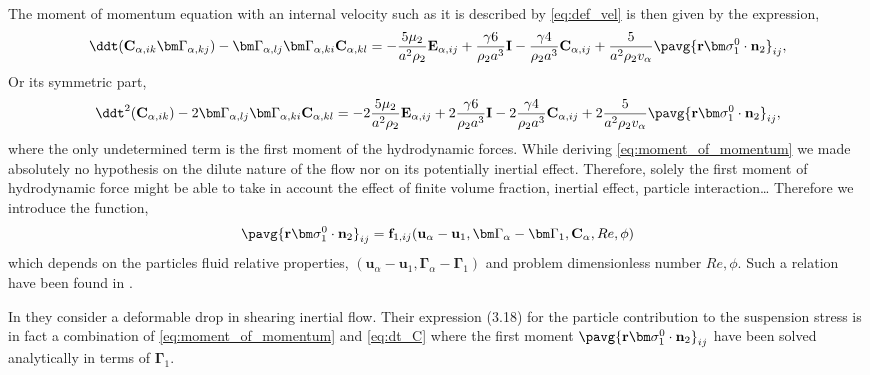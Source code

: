 The moment of momentum equation with an internal velocity such as it is described by \ref{eq:def_vel} is then given by the expression,
\begin{multline}
    \ddt (\textbf{C}_{\alpha,ik} \bm\Gamma_{\alpha,kj})
    -\bm\Gamma_{\alpha,lj}\bm\Gamma_{\alpha,ki} \textbf{C}_{\alpha,kl}
    = 
    - \frac{5\mu_2}{a^2\rho_2}  \textbf{E}_{\alpha,ij}
    + \frac{\gamma 6 }{\rho_2 a^3} \textbf{I} 
    - \frac{\gamma 4}{\rho_2 a^3} \textbf{C}_{\alpha,ij} 
    +\frac{5}{a^2 \rho_2 v_\alpha} \pavg{\textbf{r}\bm\sigma_1^0\cdot\textbf{n}_2}_{ij},
    \label{eq:moment_of_momentum}
\end{multline}
Or its symmetric part,
\begin{multline}
    \ddt^2 (\textbf{C}_{\alpha,ik})
    - 2\bm\Gamma_{\alpha,lj}\bm\Gamma_{\alpha,ki} \textbf{C}_{\alpha,kl}
    = 
    - 2\frac{5\mu_2}{a^2\rho_2}  \textbf{E}_{\alpha,ij}
    + 2\frac{\gamma 6 }{\rho_2 a^3} \textbf{I} 
    - 2\frac{\gamma 4}{\rho_2 a^3} \textbf{C}_{\alpha,ij} 
    + 2\frac{5}{a^2 \rho_2 v_\alpha} \pavg{\textbf{r}\bm\sigma_1^0\cdot\textbf{n}_2}_{ij},
    \label{eq:moment_of_momentum}
\end{multline}
where the only undetermined term is the first moment of the hydrodynamic forces. 
While deriving \ref{eq:moment_of_momentum} we made absolutely no hypothesis on the dilute nature of the flow nor on its potentially inertial effect.
Therefore, solely the first moment of hydrodynamic force might be able to take in account the effect of finite volume fraction, inertial effect, particle interaction\ldots
Therefore we introduce the function,
\begin{align*}
    \pavg{\textbf{r}\bm\sigma_1^0\cdot\textbf{n}_2}_{ij}
    = \textbf{f}_{1,ij}(\textbf{u}_\alpha - \textbf{u}_1,\bm\Gamma_\alpha - \bm\Gamma_1, \textbf{C}_{\alpha},Re,\phi) 
\end{align*}
which depends on the particles fluid relative properties, $(\textbf{u}_\alpha - \textbf{u}_1,\bm\Gamma_\alpha - \bm\Gamma_1)$ and problem dimensionless number $Re,\phi$. 
Such a relation have been found in \citet{goddard1967nonlinear}. 

In \citet{raja2010inertial} they consider a deformable drop in shearing inertial flow. 
Their expression (3.18) for the particle contribution to the suspension stress is in fact a combination of \ref{eq:moment_of_momentum} and \ref{eq:dt_C} where the first moment $\pavg{\textbf{r}\bm\sigma_1^0\cdot\textbf{n}_2}_{ij}$ have been solved analytically in terms of $\bm\Gamma_1$.

